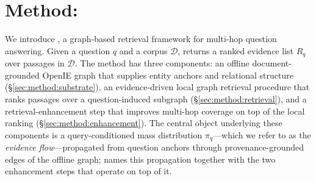 %
%
%
%

\section{Method: \methodname{}}
\label{sec:method}

We introduce \methodname{}, a graph-based retrieval framework for multi-hop
question answering. Given a question $q$ and a corpus $\mathcal{D}$,
\methodname{} returns a ranked evidence list $R_q$ over passages in
$\mathcal{D}$. The method has three components: an offline
document-grounded OpenIE graph that supplies entity anchors and relational
structure (\S\ref{sec:method:substrate}), an evidence-driven local graph
retrieval procedure that ranks passages over a question-induced subgraph
(\S\ref{sec:method:retrieval}), and a retrieval-enhancement step that
improves multi-hop coverage on top of the local ranking
(\S\ref{sec:method:enhancement}). The central object underlying these
components is a query-conditioned mass distribution $\pi_q$---which we
refer to as the \emph{evidence flow}---propagated from question anchors
through provenance-grounded edges of the offline graph; \methodname{}
names this propagation together with the two enhancement steps that
operate on top of it.

